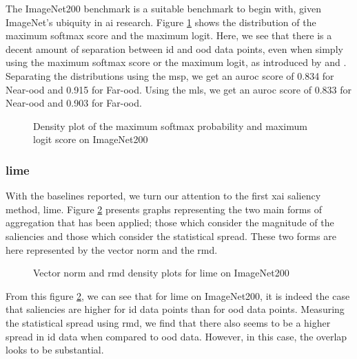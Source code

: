 \documentclass[UKenglish]{uiomasterthesis} %
\theoremstyle{definition}
\begin{document}
The ImageNet200 benchmark is a suitable benchmark to begin with, given ImageNet's ubiquity in \ac{ai} research. Figure \ref{fig:imagenet200logits} shows the distribution of the maximum softmax score and the maximum logit. Here, we see that there is a decent amount of separation between \ac{id} and \ac{ood} data points, even when simply using the maximum softmax score or the maximum logit, as introduced by \cite{oodbaseline} and \cite{mls}. Separating the distributions using the \ac{msp}, we get an \ac{auroc} score of 0.834 for Near-\ac{ood} and 0.915 for Far-\ac{ood}. Using the \ac{mls}, we get an \ac{auroc} score of 0.833 for Near-\ac{ood} and 0.903 for Far-\ac{ood}.

\begin{figure}[hbtp]
    \begin{center}
        
    \end{center}
    \caption{Density plot of the maximum softmax probability and maximum logit score on ImageNet200}
    \label{fig:imagenet200logits}
\end{figure}

\subsubsection{\ac{lime}}

With the baselines reported, we turn our attention to the first \ac{xai} saliency method, \ac{lime}. Figure \ref{fig:imagenet200limemeangini} presents graphs representing the two main forms of aggregation that has been applied; those which consider the magnitude of the saliencies and those which consider the statistical spread. These two forms are here represented by the vector norm and the \ac{rmd}.

\begin{figure}[hbtp]
    \begin{center}
        
    \end{center}
    \caption{Vector norm and \acs*{rmd} density plots for \acs*{lime} on ImageNet200}
    \label{fig:imagenet200limemeangini}
\end{figure}

From this figure \ref{fig:imagenet200limemeangini}, we can see that for \ac{lime} on ImageNet200, it is indeed the case that saliencies are higher for \ac{id} data points than for \ac{ood} data points. Measuring the statistical spread using \ac{rmd}, we find that there also seems to be a higher spread in \ac{id} data when compared to \ac{ood} data. However, in this case, the overlap looks to be substantial.
\end{document}
